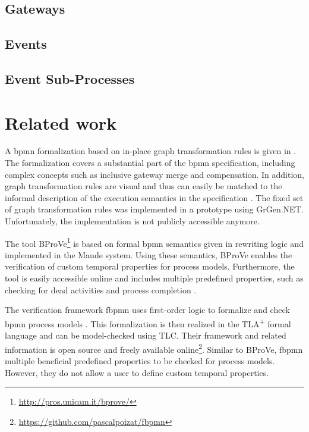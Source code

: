 \documentclass[adraft, copyright, creativecommons]{eptcs} %
\begin{document}
\subsection{Gateways}
\subsection{Events}

\subsection{Event Sub-Processes}

\section{Related work}
A \gls*{bpmn} formalization based on in-place graph transformation rules is given in \cite{vangorpVisualTokenbasedFormalization2013}.
The formalization covers a substantial part of the \gls*{bpmn} specification, including complex concepts such as inclusive gateway merge and compensation.
In addition, graph transformation rules are visual and thus can easily be matched to the informal description of the execution semantics in the specification \cite{objectmanagementgroupBusinessProcessModel2013}.
The fixed set of graph transformation rules was implemented in a prototype using GrGen.NET.
Unfortunately, the implementation is not publicly accessible anymore.

The tool BProVe\footnote{\url{http://pros.unicam.it/bprove/}} is based on formal \gls*{bpmn} semantics given in rewriting logic and implemented in the Maude system.
Using these semantics, BProVe enables the verification of custom temporal properties for process models.
Furthermore, the tool is easily accessible online and includes multiple predefined properties, such as checking for dead activities and process completion \cite{corradiniBProVeToolSupport2017, corradiniFormalApproachAnalysis2021}.

The verification framework \textsf{fbpmn} uses first-order logic to formalize and check \gls*{bpmn} process models \cite{houhouFirstOrderLogicSemantics2019, houhouFirstOrderLogicVerification2022}.
This formalization is then realized in the TLA\textsuperscript{+} formal language and can be model-checked using TLC.
Their framework and related information is open source and freely available online\footnote{\url{https://github.com/pascalpoizat/fbpmn}}.
Similar to BProVe, \textsf{fbpmn} multiple beneficial predefined properties to be checked for process models.
However, they do not allow a user to define custom temporal properties.
\end{document}
